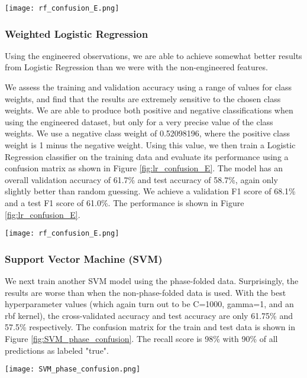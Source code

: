 \documentclass{article}
\begin{document}
\begin{figure*}[ht]
\centering
\texttt{[image: rf\_confusion\_E.png]}
\caption{A confusion matrix for our Random Forest classifier trained using 36 estimators on engineered data.}
\label{fig:rf_confusion_E}
\end{figure*}

\subsubsection{Weighted Logistic Regression}
Using the engineered observations, we are able to achieve somewhat better results from Logistic Regression than we were with the non-engineered features. 

We assess the training and validation accuracy using a range of values for class weights, and find that the results are extremely sensitive to the chosen class weights. We are able to produce both positive and negative classifications when using the engineered dataset, but only for a very precise value of the class weights. We use a negative class weight of 0.52098196, where the positive class weight is 1 minus the negative weight. Using this value, we then train a Logistic Regression classifier on the training data and
evaluate its performance using a confusion matrix as shown in Figure \ref{fig:lr_confusion_E}. The model has an overall validation
accuracy of 61.7\% and test accuracy of 58.7\%, again only slightly better than random guessing. We achieve a validation F1 score of 68.1\% and a test F1 score of 61.0\%. The performance is shown in Figure \ref{fig:lr_confusion_E}. 

\begin{figure*}[ht]
\centering
\texttt{[image: rf\_confusion\_E.png]}
\caption{A confusion matrix for our Random Forest classifier trained using 36 estimators on engineered data.}
\label{fig:lr_confusion_E}
\end{figure*}

\subsubsection{Support Vector Machine (SVM)}
We next train another SVM model using the phase-folded data. Surprisingly, the results are worse than when the non-phase-folded data is used. With the best hyperparameter values (which again turn out to be C=1000, gamma=1, and an rbf kernel), the cross-validated accuracy and test accuracy are only 61.75\% and 57.5\% respectively. The confusion matrix for the train and test data is shown in Figure \ref{fig:SVM_phase_confusion}. The recall score is 98\% with 90\% of all predictions as labeled "true". 
\begin{figure*}[ht]
\centering
\texttt{[image: SVM\_phase\_confusion.png]}
\caption{A confusion matrix for our SVM classifier trained on the engineered data.}
\label{fig:SVM_phase_confusion}
\end{figure*}
\end{document}
